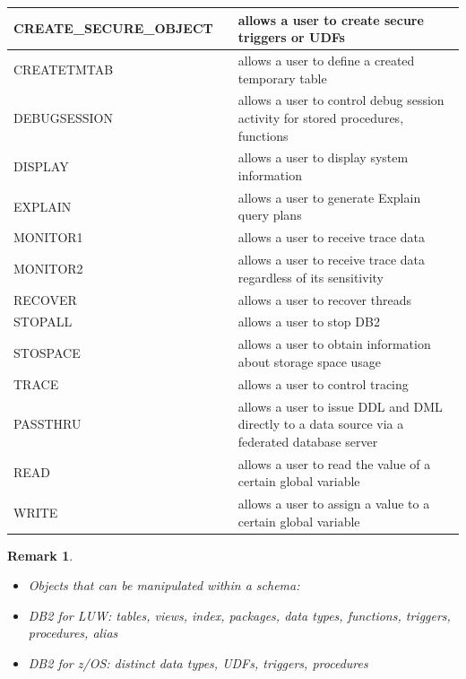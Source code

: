 \documentclass{article}
\newtheorem*{remark}{Remark}
\begin{document}
\begin{itemize}
\begin{center}
\begin{longtable}{l |p{5cm}| p{7cm}}
{\color{red} CREATE\_SECURE\_OBJECT} & & {\color{red} allows a user to create secure triggers or UDFs} 
\\\hline
{\color{red} CREATETMTAB} & & {\color{red} allows a user to define a created temporary table}\\\hline
{\color{red} DEBUGSESSION} & & {\color{red} allows a user to control debug session activity for 
stored procedures, functions} \\\hline
{\color{red} DISPLAY} & &  {\color{red}allows a user to display system information}\\\hline
{\color{red} EXPLAIN} & & {\color{red}allows a user to generate Explain query plans} \\\hline
{\color{red} MONITOR1} & & {\color{red}allows a user to receive trace data} \\\hline
{\color{red} MONITOR2} & & {\color{red}allows a user to receive trace data regardless of its sensitivity}
\\\hline
{\color{red} RECOVER} & & {\color{red}allows a user to recover threads}\\\hline
{\color{red} STOPALL} & & {\color{red}allows a user to stop DB2}\\\hline
{\color{red} STOSPACE} & & {\color{red}allows a user to obtain information about storage space usage}\\\hline
{\color{red} TRACE} & & {\color{red}allows a user to control tracing}\\\hline
{\color{green} PASSTHRU} & & {\color{green}allows a user to issue DDL and DML directly to a data source
via a federated database server}\\\hline
{\color{green}READ} & & {\color{green} allows a user to read the value of a certain global variable} \\\hline
{\color{green}WRITE} & & {\color{green} allows a user to assign a value to a certain global variable}\\\hline
\end{longtable}
\end{center}
\end{itemize}

\begin{remark}
\begin{itemize}
\item Objects that can be manipulated within a schema:
\item DB2 for LUW: tables, views, index, packages, data types, functions, triggers, procedures, alias
\item DB2 for z/OS: distinct data types, UDFs, triggers, procedures
\end{itemize}
\end{remark}
\end{document}
